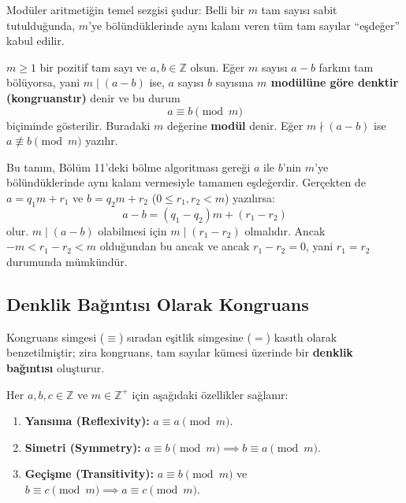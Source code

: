 Modüler aritmetiğin temel sezgisi şudur: Belli bir $m$ tam sayısı sabit tutulduğunda, $m$'ye bölündüklerinde aynı kalanı veren tüm tam sayılar ``eşdeğer'' kabul edilir.

\begin{definition}
$m \ge 1$ bir pozitif tam sayı ve $a, b \in \mathbb{Z}$ olsun. Eğer $m$ sayısı $a - b$ farkını tam bölüyorsa, yani $m \mid (a - b)$ ise, $a$ sayısı $b$ sayısına \textbf{$m$ modülüne göre denktir (kongruanstır)} denir ve bu durum
\[
a \equiv b \pmod m
\]
biçiminde gösterilir. Buradaki $m$ değerine \textbf{modül} denir. Eğer $m \nmid (a - b)$ ise $a \not\equiv b \pmod m$ yazılır.
\end{definition}

Bu tanım, Bölüm 11'deki bölme algoritması gereği $a$ ile $b$'nin $m$'ye bölündüklerinde aynı kalanı vermesiyle tamamen eşdeğerdir. Gerçekten de $a = q_1 m + r_1$ ve $b = q_2 m + r_2$ ($0 \le r_1, r_2 < m$) yazılırsa:
\[
a - b = (q_1 - q_2)m + (r_1 - r_2)
\]
olur. $m \mid (a - b)$ olabilmesi için $m \mid (r_1 - r_2)$ olmalıdır. Ancak $-m < r_1 - r_2 < m$ olduğundan bu ancak ve ancak $r_1 - r_2 = 0$, yani $r_1 = r_2$ durumunda mümkündür.

\subsection{Denklik Bağıntısı Olarak Kongruans}

Kongruans simgesi ($\equiv$) sıradan eşitlik simgesine ($=$) kasıtlı olarak benzetilmiştir; zira kongruans, tam sayılar kümesi üzerinde bir \textbf{denklik bağıntısı} oluşturur.

\begin{theorem}
Her $a, b, c \in \mathbb{Z}$ ve $m \in \mathbb{Z}^+$ için aşağıdaki özellikler sağlanır:
\begin{enumerate}
    \item \textbf{Yansıma (Reflexivity):} $a \equiv a \pmod m$.
    \item \textbf{Simetri (Symmetry):} $a \equiv b \pmod m \implies b \equiv a \pmod m$.
    \item \textbf{Geçişme (Transitivity):} $a \equiv b \pmod m$ ve $b \equiv c \pmod m \implies a \equiv c \pmod m$.
\end{enumerate}
\end{theorem}

